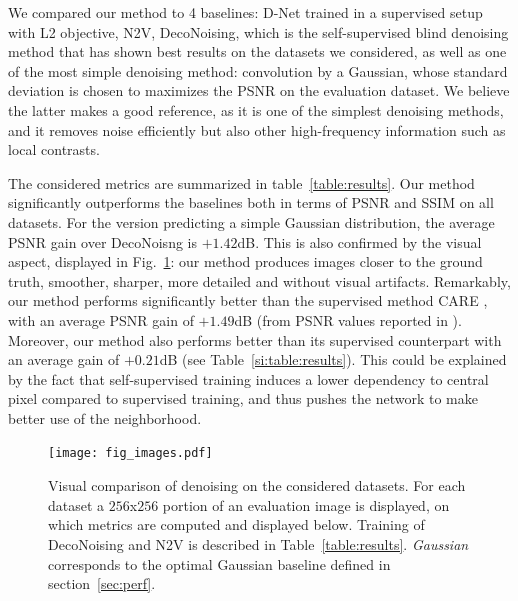 \documentclass{article}
\begin{document}
We compared our method to 4 baselines: D-Net trained in a supervised setup with L2 objective, N2V, DecoNoising, which is the self-supervised blind denoising method that has shown best results on the datasets we considered, as well as one of the most simple denoising method: convolution by a Gaussian, whose standard deviation is chosen to maximizes the PSNR on the evaluation dataset.
We believe the latter makes a good reference, as it is one of the simplest denoising methods, and it removes noise efficiently but also other high-frequency information such as local contrasts.

The considered metrics are summarized in table~\ref{table:results}.
Our method significantly outperforms the baselines both in terms of PSNR and SSIM on all datasets.
For the version predicting a simple Gaussian distribution, the average PSNR gain over DecoNoisng is $+1.42$dB.
This is also confirmed by the visual aspect, displayed in Fig.~\ref{fig:images}: our method produces images closer to the ground truth, smoother, sharper, more detailed and without visual artifacts.
Remarkably, our method performs significantly better than the supervised method CARE \cite{weigert2017content}, with an average PSNR gain of $+1.49$dB (from PSNR values reported in \cite{goncharova2020}).
Moreover, our method also performs better than its supervised counterpart with an average gain of $+0.21$dB (see Table~\ref{si:table:results}).
This could be explained by the fact that self-supervised training induces a lower dependency to central pixel compared to supervised training, and thus pushes the network to make better use of the neighborhood.

\begin{figure}[!htbp]
\vskip -0.1in
\texttt{[image: fig\_images.pdf]}
\caption{Visual comparison of denoising on the considered datasets. For each dataset a $256$x$256$ portion of an evaluation image is displayed, on which metrics are computed and displayed below. Training of DecoNoising and N2V is described in Table~\ref{table:results}. \textit{Gaussian} corresponds to the optimal Gaussian baseline defined in section~\ref{sec:perf}.}
\label{fig:images}
\end{figure}
\end{document}
